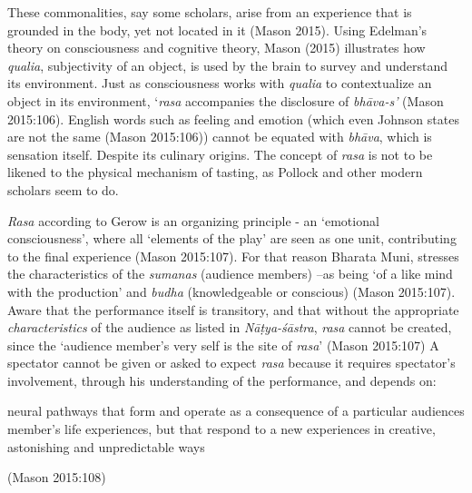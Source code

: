 These commonalities, say some scholars, arise from an experience that is grounded in the body, yet not located in it (Mason 2015). Using Edelman’s theory on consciousness and cognitive theory, Mason (2015) illustrates how \textsl{qualia}, subjectivity of an object, is used by the brain to survey and understand its environment. Just as consciousness works with \textsl{qualia} to contextualize an object in its environment, ‘\textsl{rasa} accompanies the disclosure of \textsl{bhāva-s’} (Mason 2015:106). English words such as feeling and emotion (which even Johnson states are not the same (Mason 2015:106)) cannot be equated with \textsl{bhāva}, which is sensation itself. Despite its culinary origins. The concept of \textsl{rasa} is not to be likened to the physical mechanism of tasting, as Pollock and other modern scholars seem to do.

\textsl{Rasa} according to Gerow is an organizing principle - an ‘emotional consciousness’, where all ‘elements of the play’ are seen as one unit, contributing to the final experience (Mason 2015:107). For that reason Bharata Muni, stresses the characteristics of the \textsl{sumanas} (audience members) –as being ‘of a like mind with the production’ and \textsl{budha} (knowledgeable or conscious) (Mason 2015:107). Aware that the performance itself is transitory, and that without the appropriate \textsl{characteristics} of the audience as listed in \textsl{Nāṭya-śāstra}, \textsl{rasa} cannot be created, since the ‘audience member’s very self is the site of \textsl{rasa}’ (Mason 2015:107) A spectator cannot be given or asked to expect \textsl{rasa} because it requires spectator’s involvement, through his understanding of the performance, and depends on:

\begin{myquote}
neural pathways that form and operate as a consequence of a particular audiences member’s life experiences, but that respond to a new experiences in creative, astonishing and unpredictable ways 

\hfill (Mason 2015:108) 
\end{myquote}

